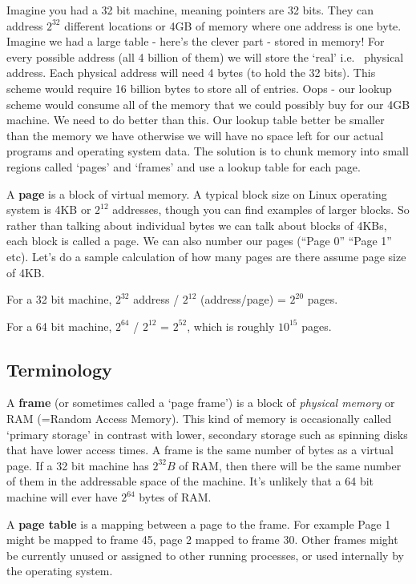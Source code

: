 \begin{enumerate}
Imagine you had a 32 bit machine, meaning pointers are 32 bits. They can address $2^{32}$ different locations or 4GB of memory where one address is one byte. Imagine we had a large table - here's the clever part - stored in memory! For every possible address (all 4 billion of them) we will store the `real' i.e. ~physical address. Each physical address will need 4 bytes (to hold the 32 bits). This scheme would require 16 billion bytes to store all of entries. Oops - our lookup scheme would consume all of the memory that we could possibly buy for our 4GB machine. We need to do better than this. Our lookup table better be smaller than the memory we have otherwise we will have no space left for our actual programs and operating system data. The solution is to chunk memory into small regions called `pages' and `frames' and use a lookup table for each page.

A \textbf{page} is a block of virtual memory. A typical block size on Linux operating system is 4KB or $2^{12}$ addresses, though you can find examples of larger blocks. So rather than talking about individual bytes we can talk about blocks of 4KBs, each block is called a page. We can also number our pages (``Page 0'' ``Page 1'' etc). Let's do a sample calculation of how many pages are there assume page size of 4KB.

\begin{shaded*}
For a 32 bit machine, $2^{32}$ address / $2^{12}$ (address/page) = $2^{20}$ pages.

For a 64 bit machine, $2^{64}$ / $2^{12}$ = $2^{52}$, which is roughly $10^{15}$ pages.
\end{shaded*}

\subsection{Terminology}

A \textbf{frame} (or sometimes called a `page frame') is a block of \emph{physical memory} or RAM (=Random Access Memory). This kind of memory is occasionally called `primary storage' in contrast with lower, secondary storage such as spinning disks that have lower access times. A frame is the same number of bytes as a virtual page. If a 32 bit machine has $2^{32} B$ of RAM, then there will be the same number of them in the addressable space of the machine. It's unlikely that a 64 bit machine will ever have $2^{64}$ bytes of RAM.

A \textbf{page table} is a mapping between a page to the frame. For example Page 1 might be mapped to frame 45, page 2 mapped to frame 30. Other frames might be currently unused or assigned to other running processes, or used internally by the operating system.


\end{enumerate}
